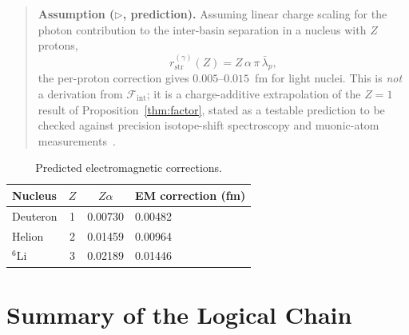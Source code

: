 \documentclass[12pt]{article}
\newcommand{\Fcal}{\mathcal{F}}
\newcommand{\Fint}{\Fcal_{\mathrm{int}}}
\newcommand{\lbar}{\bar{\lambda}}
\begin{document}
\begin{quote}
\textbf{Assumption ($\triangleright$, prediction).} Assuming linear charge scaling for the photon contribution to the inter-basin separation in a nucleus with $Z$ protons,
\begin{equation}\label{eq:Zalpha}
    r_{\mathrm{str}}^{(\gamma)}(Z) = Z\,\alpha\,\pi\,\lbar_p,
\end{equation}
the per-proton correction gives $0.005$--$0.015$~fm for light nuclei. This is \emph{not} a derivation from $\Fint$; it is a charge-additive extrapolation of the $Z=1$ result of Proposition~\ref{thm:factor}, stated as a testable prediction to be checked against precision isotope-shift spectroscopy and muonic-atom measurements~\citep{Pohl2010}.
\end{quote}

\begin{table}[ht]
\centering
\caption{Predicted electromagnetic corrections.}
\label{tab:Zalpha}
\begin{tabular}{@{}lccl@{}}
\toprule
Nucleus & $Z$ & $Z\alpha$ & EM correction (fm) \\
\midrule
Deuteron & 1 & 0.00730 & 0.00482 \\
Helion & 2 & 0.01459 & 0.00964 \\
${}^6$Li & 3 & 0.02189 & 0.01446 \\
\bottomrule
\end{tabular}
\end{table}

\section{Summary of the Logical Chain}\label{sec:chain}
\end{document}

